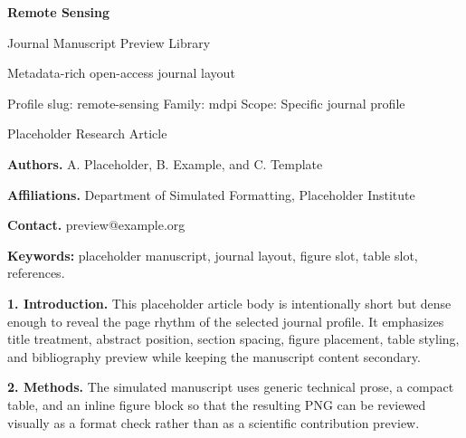 \documentclass[10pt,a4paper]{article}
\begin{document}
\begin{center}
{\LARGE\bfseries Remote Sensing}\par
\vspace{0.25em}
{\small Journal Manuscript Preview Library}\par
\vspace{0.15em}
{\footnotesize Metadata-rich open-access journal layout}\par
\vspace{0.2em}
{\footnotesize Profile slug: remote-sensing \quad Family: mdpi \quad Scope: Specific journal profile}
\end{center}
\vspace{0.2em}
 Placeholder Research Article\par\vspace{0.4em}


\noindent\textbf{Authors.} A. Placeholder, B. Example, and C. Template\par
\noindent\textbf{Affiliations.} Department of Simulated Formatting, Placeholder Institute\par
\noindent\textbf{Contact.} preview@example.org\par
\vspace{0.4em}
\par\vspace{0.6em}
\noindent\textbf{Keywords:} placeholder manuscript, journal layout, figure slot, table slot, references.\par\vspace{0.6em}


\small
\textbf{1. Introduction.} This placeholder article body is intentionally short but dense enough to reveal the page rhythm of the selected journal profile. It emphasizes title treatment, abstract position, section spacing, figure placement, table styling, and bibliography preview while keeping the manuscript content secondary.

\textbf{2. Methods.} The simulated manuscript uses generic technical prose, a compact table, and an inline figure block so that the resulting PNG can be reviewed visually as a format check rather than as a scientific contribution preview.
\end{document}
